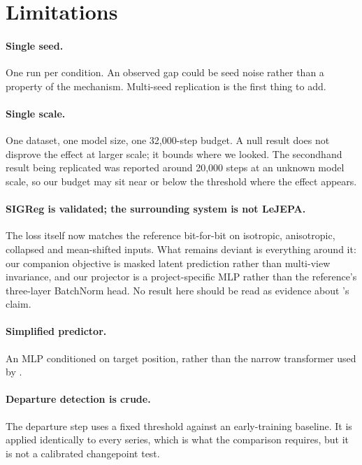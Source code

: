 \section{Limitations}

\paragraph{Single seed.} One run per condition. An observed gap could be seed noise rather
than a property of the mechanism. Multi-seed replication is the first thing to add.

\paragraph{Single scale.} One dataset, one model size, one 32{,}000-step budget. A null
result does not disprove the effect at larger scale; it bounds where we looked. The
secondhand result being replicated was reported around 20{,}000 steps at an unknown model
scale, so our budget may sit near or below the threshold where the effect appears.

\paragraph{SIGReg is validated; the surrounding system is not LeJEPA.} The loss itself now
matches the reference bit-for-bit on isotropic, anisotropic, collapsed and mean-shifted
inputs. \interp{} What remains deviant is everything around it: our companion objective is
masked latent prediction rather than multi-view invariance, and our projector is a
project-specific MLP rather than the reference's three-layer BatchNorm head. No result here
should be read as evidence about \citet{lejepa2025}'s claim.

\paragraph{Simplified predictor.} An MLP conditioned on target position, rather than the
narrow transformer used by \citet{assran2023ijepa}.

\paragraph{Departure detection is crude.} The departure step uses a fixed threshold against
an early-training baseline. It is applied identically to every series, which is what the
comparison requires, but it is not a calibrated changepoint test.

